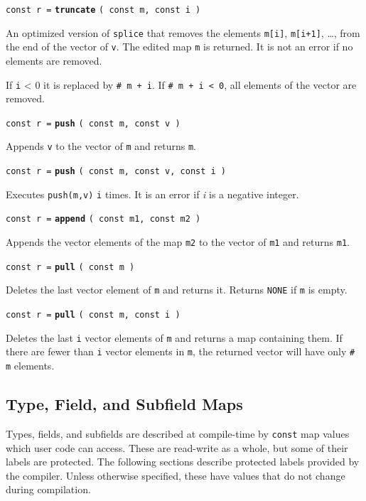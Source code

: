 \documentclass[12pt]{article}
\newcommand{\ttkey}[1]{{\tt \bfseries #1}}
\newenvironment{indpar}[1][0.3in]%
	{\begin{list}{}%
		     {\setlength{\itemsep}{0in}%
		      \setlength{\topsep}{0in}%
		      \setlength{\parsep}{1ex}%
		      \setlength{\labelwidth}{#1}%
		      \setlength{\leftmargin}{#1}%
		      \addtolength{\leftmargin}{\labelsep}}%
	 \item}%
	{\end{list}}
\begin{document}
{\tt const r =} \ttkey{truncate} {\tt ( const m, const i )}
\begin{indpar}
An optimized version of {\tt splice} that removes the elements
{\tt m[i]}, {\tt m[i+1]}, \ldots, from the end of the vector of {\tt v}.
The edited map {\tt m} is returned.  It is not an error if no elements
are removed.

If {\tt i} < 0 it is replaced by {\tt \# m + i}.  If {\tt \# m + i < 0},
all elements of the vector are removed.
\end{indpar}

{\tt const r =} \ttkey{push} {\tt ( const m, const v )}
\begin{indpar}
Appends {\tt v} to the vector of {\tt m} and returns {\tt m}.
\end{indpar}

{\tt const r =} \ttkey{push} {\tt ( const m, const v, const i )}
\begin{indpar}
Executes {\tt push(m,v)} {\tt i} times.  It is an error if {\em i}
is a negative integer.
\end{indpar}

{\tt const r =} \ttkey{append} {\tt ( const m1, const m2 )}
\begin{indpar}
Appends the vector elements of the map {\tt m2} to the vector of {\tt m1}
and returns {\tt m1}.
\end{indpar}

{\tt const r =} \ttkey{pull} {\tt ( const m )}
\begin{indpar}
Deletes the last vector element of {\tt m} and returns it.
Returns {\tt NONE} if {\tt m} is empty.
\end{indpar}

{\tt const r =} \ttkey{pull} {\tt ( const m, const i )}
\begin{indpar}
Deletes the last {\tt i} vector elements of {\tt m} and returns a map
containing them.  If there are fewer than {\tt i} vector elements
in {\tt m}, the returned vector will have only {\tt \# m} elements.
\end{indpar}

\subsection{Type, Field, and Subfield Maps}
\label{TYPE-FIELD-SUBFIELD-MAPS}

Types, fields, and subfields are described
at compile-time by {\tt const} map values which
user code can access.
These are read-write as a whole, but some of their
labels are protected.  The following sections describe protected labels
provided by the compiler.  Unless otherwise specified,
these have values that do not change during compilation.
\end{document}
